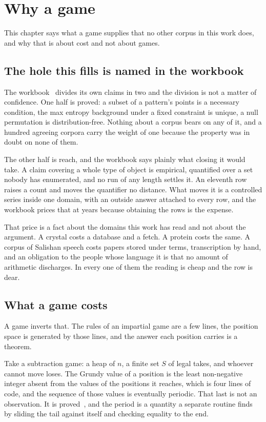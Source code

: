 \chapter{Why a game}

This chapter says what a game supplies that no other corpus in this work does, and why that is
about cost and not about games.


\section{The hole this fills is named in the workbook}

The workbook~\cite{src:Quigg-orior-workbook} divides its own claims in two and the division is not a matter of confidence. One half
is proved: a subset of a pattern's points is a necessary condition, the max entropy background
under a fixed constraint is unique, a null permutation is distribution-free. Nothing about a corpus
bears on any of it, and a hundred agreeing corpora carry the weight of one because the property was
in doubt on none of them.

The other half is reach, and the workbook says plainly what closing it would take. A claim covering
a whole type of object is empirical, quantified over a set nobody has enumerated, and no run of any
length settles it. An eleventh row raises a count and moves the quantifier no distance. What moves
it is a controlled series inside one domain, with an outside answer attached to every row, and the
workbook prices that at years because obtaining the rows is the expense.

That price is a fact about the domains this work has read and not about the argument. A crystal costs
a database and a fetch. A protein costs the same. A corpus of Salishan speech costs papers stored
under terms, transcription by hand, and an obligation to the people whose language it is that no
amount of arithmetic discharges. In every one of them the reading is cheap and the row is dear.

\section{What a game costs}

A game inverts that. The rules of an impartial game are a few lines, the position space is generated
by those lines, and the answer each position carries is a theorem.

Take a subtraction game: a heap of \(n\), a finite set \(S\) of legal takes, and whoever cannot move
loses. The Grundy value of a position is the least non-negative integer absent from the values of
the positions it reaches, which is four lines of code, and the sequence of those values is
eventually periodic. That last is not an observation. It is proved~\cite{src:Berlekamp-Conway-and-Guy-1982}, and the period is a quantity a
separate routine finds by sliding the tail against itself and checking equality to the end.

